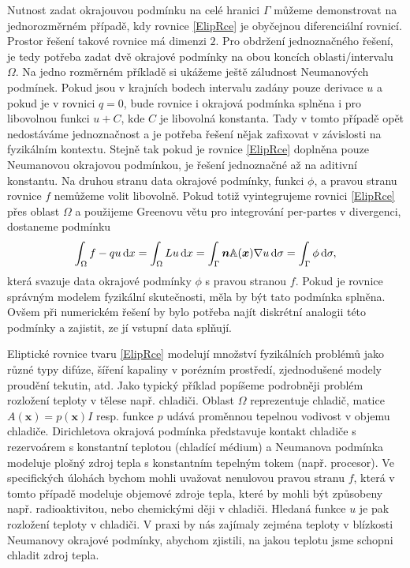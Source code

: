\documentclass[a4paper,10pt]{article}
\def\grad{\nabla}
\def\d{\,{\rm d}}               %
\def\dx{\d x}
\def\vc#1{\mathbf{\boldsymbol{#1}}}     %
\def\tn#1{{\mathbb{#1}}}    %
\begin{document}
Nutnost zadat okrajouvou podmínku na celé hranici $\Gamma$ můžeme demonstrovat na jednorozměrném případě,
kdy rovnice \eqref{ElipRce} je obyčejnou diferenciální rovnicí. Prostor řešení takové rovnice má dimenzi $2$. 
Pro obdržení jednoznačného řešení, je tedy potřeba zadat dvě okrajové podmínky na obou koncích oblasti/intervalu $\Omega$. Na jedno rozměrném příkladě si ukážeme ještě záludnost Neumanových podmínek.
Pokud jsou v krajních bodech intervalu zadány pouze derivace $u$ a pokud je 
v rovnici $q=0$, bude rovnice i okrajová podmínka splněna i pro libovolnou funkci $u+C$, kde $C$ je libovolná konstanta.
Tady v tomto případě opět nedostáváme jednoznačnost a je potřeba řešení nějak zafixovat v závislosti na fyzikálním kontextu. Stejně tak pokud je rovnice \eqref{ElipRce} doplněna pouze Neumanovou okrajovou podmínkou, je řešení jednoznačné až na aditivní konstantu. Na druhou stranu data okrajové podmínky, funkci $\phi$, a pravou stranu rovnice $f$ nemůžeme volit libovolně.
Pokud totiž vyintegrujeme rovnici \eqref{ElipRce} přes oblast $\Omega$ a použijeme Greenovu větu pro integrování per-partes v divergenci, dostaneme podmínku
\[
  \int_\Omega f- qu\dx=\int_\Omega L u \dx=\int_\Gamma \vc n\tn A(\vc x) \grad u\d\sigma=
  \int_\Gamma \phi\d\sigma,
\]
která svazuje data okrajové podmínky $\phi$ s pravou stranou $f$.
Pokud je rovnice správným modelem fyzikální skutečnosti, měla by být tato podmínka splněna. Ovšem
při numerickém řešení by bylo potřeba najít diskrétní analogii této podmínky a zajistit, ze jí vstupní data splňují.



Eliptické rovnice tvaru \eqref{ElipRce} modelují množství fyzikálních problémů jako
různé typy difúze, šíření kapaliny v porézním prostředí, zjednodušené modely proudění tekutin, atd. 
Jako typický příklad popíšeme podrobněji problém rozložení teploty v tělese např. chladiči. 
Oblast $\Omega$ reprezentuje chladič, matice $A(\vc x)=p(\vc x)I$ resp. funkce $p$ udává 
proměnnou tepelnou vodivost v objemu chladiče. Dirichletova okrajová podmínka představuje kontakt chladiče 
s rezervoárem s konstantní teplotou (chladící médium) a Neumanova podmínka modeluje plošný zdroj tepla s 
konstantním tepelným tokem (např. procesor). Ve specifických úlohách bychom mohli uvažovat nenulovou pravou 
stranu $f$, která v tomto případě modeluje objemové zdroje tepla, které by mohli být způsobeny např. 
radioaktivitou, nebo chemickými ději v chladiči. Hledaná funkce $u$ je pak rozložení teploty v chladiči. 
V praxi by nás zajímaly zejména teploty v blízkosti Neumanovy okrajové podmínky, abychom zjistili, na 
jakou teplotu jsme schopni chladit zdroj tepla.
\end{document}
